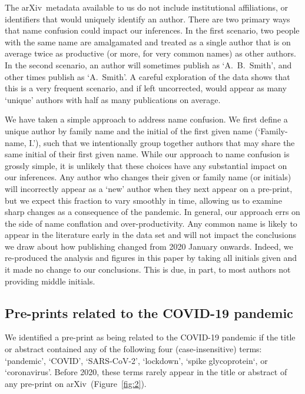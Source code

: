 \documentclass[]{rsos}%
\newcommand{\arxiv}{arXiv}
\newcommand{\change}[1]{#1}
\begin{document}
The \arxiv\ metadata available to us do not include institutional affiliations, or identifiers that would uniquely identify an author. 
There are two primary ways that name confusion could impact our inferences. In the first scenario, two people with the same name are amalgamated and treated as a single author that is on average twice as productive (or more, for very common names) as other authors. In the second scenario, an author will sometimes publish as `A.~B.~Smith', and other times publish as `A.~Smith'. A careful exploration of the data shows that this is a very frequent scenario, and if left uncorrected, would appear as many `unique' authors with half as many publications on average.

We have taken a simple approach to address name confusion. We first define a unique author by family name and the initial of the first given name (`Family-name, I.'), such that we intentionally group together authors that may share the same initial of their first given name. 
While our approach to name confusion is grossly simple, it is unlikely that these choices have any substantial impact on our inferences. \change{Any author who changes their given or family name (or initials) will incorrectly appear as a `new' author when they next appear on a pre-print, but we expect this fraction to vary smoothly in time, allowing us to examine sharp changes as a consequence of the pandemic.} In general, \change{our approach} errs on the side of name conflation and over-productivity. 
Any common name is likely to appear in the literature early in the data set and will not impact the conclusions we draw about how publishing changed from 2020 January onwards. Indeed, we re-produced the analysis and figures in this paper by taking all initials given and it made no change to our conclusions. This is due, in part, to most authors not providing middle initials.

\subsection*{Pre-prints related to the COVID-19 pandemic}

We identified a pre-print as being related to the COVID-19 pandemic if the title or abstract contained any of the following four (case-insensitive) terms: `pandemic', `COVID', `SARS-CoV-2', `lockdown', \change{`spike glycoprotein`}, or `coronavirus'. Before 2020, these terms rarely appear in the title or abstract of any pre-print on \arxiv\ (Figure~\ref{fig:2}). 
\end{document}
